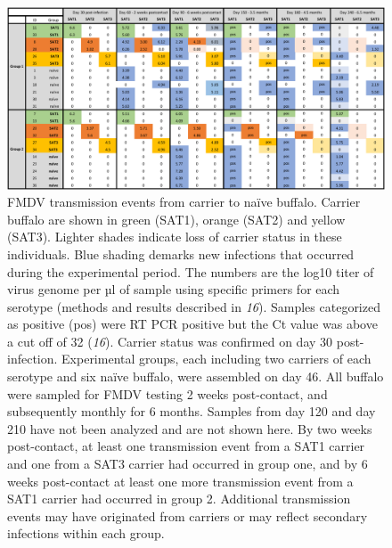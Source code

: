 \documentclass[12pt, USenglish]{article}  %
\begin{document}
\begin{figure}
  \centering
  \includegraphics[width=\textwidth]{../transmission_experiment_table}
  \caption{FMDV transmission events from carrier to naïve
    buffalo. Carrier buffalo are shown in green (SAT1), orange (SAT2)
    and yellow (SAT3). Lighter shades indicate loss of carrier status
    in these individuals. Blue shading demarks new infections that
    occurred during the experimental period. The numbers are the log10
    titer of virus genome per \unit{µl} of sample using specific
    primers for each serotype (methods and results described in
    \textit{16}). Samples categorized as positive (pos) were RT PCR
    positive but the Ct value was above a cut off of 32
    (\textit{16}). Carrier status was confirmed on day 30
    post-infection. Experimental groups, each including two carriers
    of each serotype and six naïve buffalo, were assembled on day
    46. All buffalo were sampled for FMDV testing 2 weeks
    post-contact, and subsequently monthly for 6 months. Samples from
    day 120 and day 210 have not been analyzed and are not shown
    here. By two weeks post-contact, at least one transmission event
    from a SAT1 carrier and one from a SAT3 carrier had occurred in
    group one, and by 6 weeks post-contact at least one more
    transmission event from a SAT1 carrier had occurred in group
    2. Additional transmission events may have originated from
    carriers or may reflect secondary infections within each group.}
\end{figure}
\end{document}
